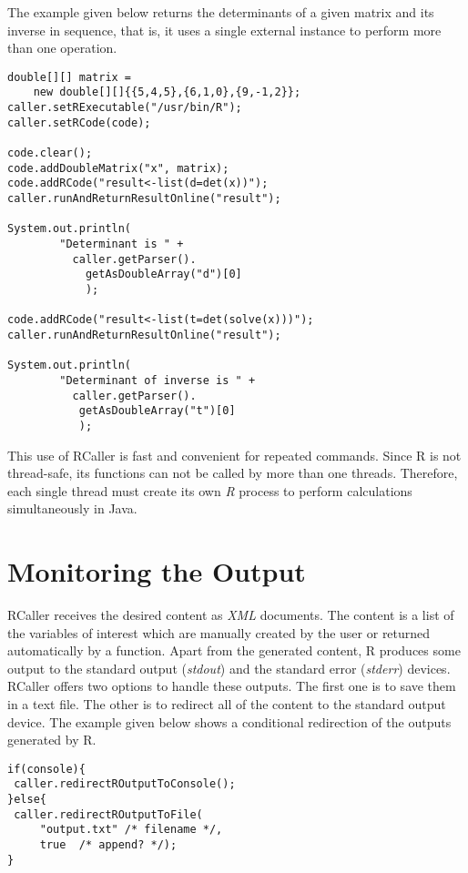 \documentclass[10pt,a4paper]{article}
\begin{document}
The example given below returns the determinants of a given matrix and its inverse in sequence, that is, it uses a single external instance to perform more than one operation.

\begin{verbatim}
double[][] matrix = 
    new double[][]{{5,4,5},{6,1,0},{9,-1,2}};
caller.setRExecutable("/usr/bin/R");    
caller.setRCode(code);
    
code.clear();
code.addDoubleMatrix("x", matrix);
code.addRCode("result<-list(d=det(x))");
caller.runAndReturnResultOnline("result");

System.out.println( 
		"Determinant is " + 
		  caller.getParser().
		  	getAsDoubleArray("d")[0]
		  	);
    
code.addRCode("result<-list(t=det(solve(x)))");
caller.runAndReturnResultOnline("result");

System.out.println(
		"Determinant of inverse is " + 
		  caller.getParser().
		   getAsDoubleArray("t")[0]
		   );
\end{verbatim}

\noindent This use of RCaller is fast and convenient for repeated commands. Since R is not thread-safe, its functions can not be called
by more than one threads. Therefore, each single thread must create its own \emph{R} process to perform calculations simultaneously in Java.

\section{Monitoring the Output}
RCaller receives the desired content as \emph{XML} documents. The content is a list of the variables of interest which are manually created by the user or
returned automatically by a function. Apart from the generated content, R produces some output to the standard output (\emph{stdout})
and the standard error (\emph{stderr}) devices. RCaller offers two options to handle these outputs. The first one is to save them in a text file. 
The other is to redirect all of the content to the standard output device. The example given below shows a conditional redirection of the outputs
generated by R.

\begin{verbatim}
if(console){
 caller.redirectROutputToConsole();
}else{
 caller.redirectROutputToFile(
     "output.txt" /* filename */, 
     true  /* append? */);
}
\end{verbatim}
\end{document}
